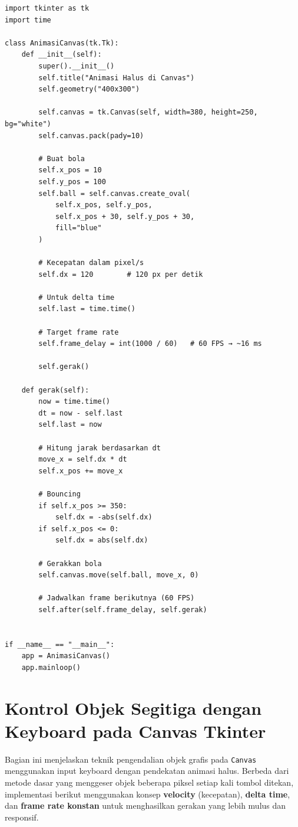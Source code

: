 \begin{lstlisting}[style=PythonStyle, caption={Animasi bola pada Canvas}, label={lst:b12-animasi-bola-canvas}]
import tkinter as tk
import time

class AnimasiCanvas(tk.Tk):
    def __init__(self):
        super().__init__()
        self.title("Animasi Halus di Canvas")
        self.geometry("400x300")

        self.canvas = tk.Canvas(self, width=380, height=250, bg="white")
        self.canvas.pack(pady=10)

        # Buat bola
        self.x_pos = 10
        self.y_pos = 100
        self.ball = self.canvas.create_oval(
            self.x_pos, self.y_pos,
            self.x_pos + 30, self.y_pos + 30,
            fill="blue"
        )

        # Kecepatan dalam pixel/s
        self.dx = 120        # 120 px per detik

        # Untuk delta time
        self.last = time.time()

        # Target frame rate
        self.frame_delay = int(1000 / 60)   # 60 FPS → ~16 ms

        self.gerak()

    def gerak(self):
        now = time.time()
        dt = now - self.last
        self.last = now

        # Hitung jarak berdasarkan dt
        move_x = self.dx * dt
        self.x_pos += move_x

        # Bouncing
        if self.x_pos >= 350:
            self.dx = -abs(self.dx)
        if self.x_pos <= 0:
            self.dx = abs(self.dx)

        # Gerakkan bola
        self.canvas.move(self.ball, move_x, 0)

        # Jadwalkan frame berikutnya (60 FPS)
        self.after(self.frame_delay, self.gerak)


if __name__ == "__main__":
    app = AnimasiCanvas()
    app.mainloop()

\end{lstlisting}



\section{Kontrol Objek Segitiga dengan Keyboard pada Canvas Tkinter}

Bagian ini menjelaskan teknik pengendalian objek grafis pada \texttt{Canvas} menggunakan input keyboard dengan pendekatan animasi halus. Berbeda dari metode dasar yang menggeser objek beberapa piksel setiap kali tombol ditekan, implementasi berikut menggunakan konsep \textbf{velocity} (kecepatan), \textbf{delta time}, dan \textbf{frame rate konstan} untuk menghasilkan gerakan yang lebih mulus dan responsif.

